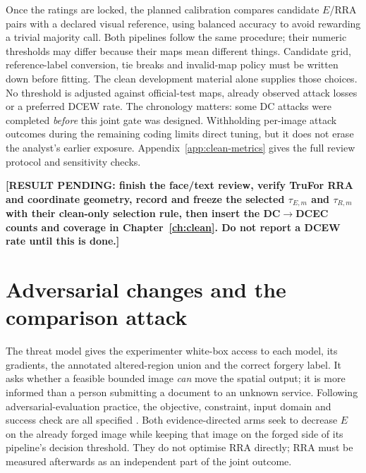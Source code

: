 Once the ratings are locked, the planned calibration compares candidate $E$/RRA pairs with a declared visual reference, using balanced accuracy to avoid rewarding a trivial majority call. Both pipelines follow the same procedure; their numeric thresholds may differ because their maps mean different things. Candidate grid, reference-label conversion, tie breaks and invalid-map policy must be written down before fitting. The clean development material alone supplies those choices. No threshold is adjusted against official-test maps, already observed attack losses or a preferred DCEW rate. The chronology matters: some DC attacks were completed \emph{before} this joint gate was designed. Withholding per-image attack outcomes during the remaining coding limits direct tuning, but it does not erase the analyst's earlier exposure. Appendix~\ref{app:clean-metrics} gives the full review protocol and sensitivity checks.

\noindent\textbf{[RESULT PENDING: finish the face/text review, verify TruFor RRA and coordinate geometry, record and freeze the selected $\tau_{E,m}$ and $\tau_{R,m}$ with their clean-only selection rule, then insert the DC$\rightarrow$DCEC counts and coverage in Chapter~\ref{ch:clean}. Do not report a DCEW rate until this is done.]}

\section{Adversarial changes and the comparison attack}
\label{sec:method-attacks}

The threat model gives the experimenter white-box access to each model, its gradients, the annotated altered-region union and the correct forgery label. It asks whether a feasible bounded image \emph{can} move the spatial output; it is more informed than a person submitting a document to an unknown service. Following adversarial-evaluation practice, the objective, constraint, input domain and success check are all specified \citep{madry2018towards,carlini2019evaluating}. Both evidence-directed arms seek to decrease $E$ on the already forged image while keeping that image on the forged side of its pipeline's decision threshold. They do not optimise RRA directly; RRA must be measured afterwards as an independent part of the joint outcome.

